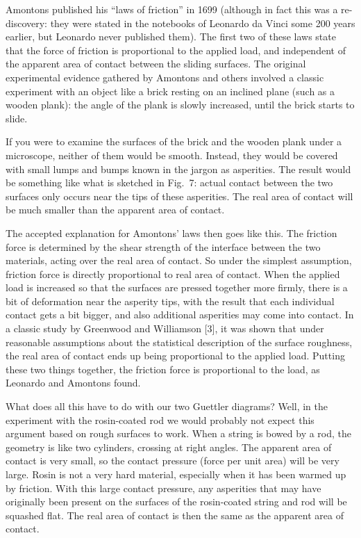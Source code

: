   Amontons published his “laws of friction” in 1699 (although in fact this was 
  a re-discovery: they were stated in the notebooks of Leonardo da Vinci some 
  200 years earlier, but Leonardo never published them). The first two of these 
  laws state that the force of friction is proportional to the applied load, 
  and independent of the apparent area of contact between the sliding surfaces. 
  The original experimental evidence gathered by Amontons and others involved a 
  classic experiment with an object like a brick resting on an inclined plane 
  (such as a wooden plank): the angle of the plank is slowly increased, until 
  the brick starts to slide. 

  If you were to examine the surfaces of the brick and the wooden plank under a 
  microscope, neither of them would be smooth. Instead, they would be covered 
  with small lumps and bumps known in the jargon as asperities. The result 
  would be something like what is sketched in Fig.\ 7: actual contact between 
  the two surfaces only occurs near the tips of these asperities. The real area 
  of contact will be much smaller than the apparent area of contact. 


  The accepted explanation for Amontons’ laws then goes like this. The friction 
  force is determined by the shear strength of the interface between the two 
  materials, acting over the real area of contact. So under the simplest 
  assumption, friction force is directly proportional to real area of contact. 
  When the applied load is increased so that the surfaces are pressed together 
  more firmly, there is a bit of deformation near the asperity tips, with the 
  result that each individual contact gets a bit bigger, and also additional 
  asperities may come into contact. In a classic study by Greenwood and 
  Williamson [3], it was shown that under reasonable assumptions about the 
  statistical description of the surface roughness, the real area of contact 
  ends up being proportional to the applied load. Putting these two things 
  together, the friction force is proportional to the load, as Leonardo and 
  Amontons found. 

  What does all this have to do with our two Guettler diagrams? Well, in the 
  experiment with the rosin-coated rod we would probably not expect this 
  argument based on rough surfaces to work. When a string is bowed by a rod, 
  the geometry is like two cylinders, crossing at right angles. The apparent 
  area of contact is very small, so the contact pressure (force per unit area) 
  will be very large. Rosin is not a very hard material, especially when it has 
  been warmed up by friction. With this large contact pressure, any asperities 
  that may have originally been present on the surfaces of the rosin-coated 
  string and rod will be squashed flat. The real area of contact is then the 
  same as the apparent area of contact. 


